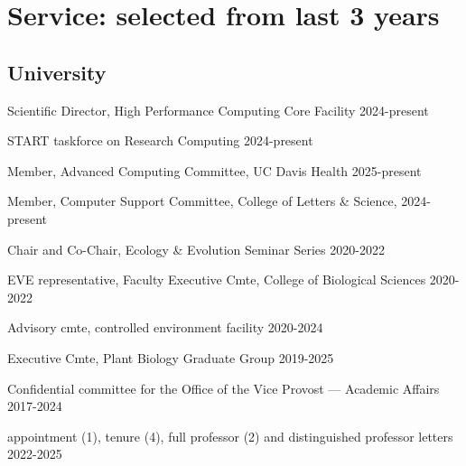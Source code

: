 \documentclass[letterpaper,10pt]{article}
\newcommand{\ignore}[1]{}
\renewenvironment{itemize}{
  \begin{list}{}{
    \setlength{\leftmargin}{1.5em}
  }
}{
  \end{list}
}
\begin{document}
\section*{Service: selected from last 3 years}
\begin{itemize}
\setlength\itemsep{0ex}
\subsection*{University}
\item Scientific Director, High Performance Computing Core Facility \hfill 2024-present
\item START taskforce on Research Computing \hfill 2024-present
\item Member, Advanced Computing Committee, UC Davis Health \hfill 2025-present
\item Member, Computer Support Committee, College of Letters \& Science, \hfill 2024-present
\item Chair and Co-Chair, Ecology \& Evolution Seminar Series \hfill 2020-2022
\item EVE representative, Faculty Executive Cmte, College of Biological Sciences \hfill 2020-2022
\item Advisory cmte, controlled environment facility \hfill 2020-2024
\item Executive Cmte, Plant Biology Graduate Group \hfill 2019-2025
\item Confidential committee for the Office of the Vice Provost --- Academic Affairs  \hfill2017-2024 %
\item \ignore{Todesco 2022} appointment (1), \ignore {Mandel 2023, Cornejo 2022, Grace Lee 2024, Hodgins 2023} tenure (4), \ignore{Lowry 2023, Hernandez 2021} full professor (2)  and distinguished professor \ignore{Dawe 2024} letters \hfill 2022-2025

\end{itemize}
\end{document}
